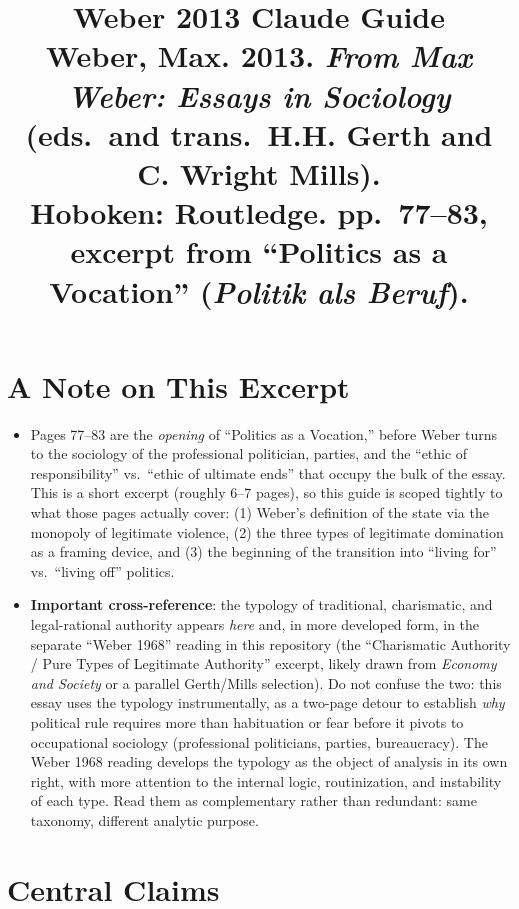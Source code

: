 \documentclass[12pt]{article}
\title{\textbf{Weber 2013 Claude Guide}\\
\large Weber, Max. 2013. \textit{From Max Weber: Essays in Sociology} (eds.\ and trans.\ H.H. Gerth and C. Wright Mills).\\
Hoboken: Routledge. pp.\ 77--83, excerpt from ``Politics as a Vocation'' (\textit{Politik als Beruf}).}
\author{}
\date{}
\begin{document}
\maketitle
\tableofcontents
\newpage

\section{A Note on This Excerpt}

\begin{itemize}[leftmargin=*, itemsep=4pt]
    \item Pages 77--83 are the \emph{opening} of ``Politics as a Vocation,'' before Weber turns to the sociology of the professional politician, parties, and the ``ethic of responsibility'' vs.\ ``ethic of ultimate ends'' that occupy the bulk of the essay. This is a short excerpt (roughly 6--7 pages), so this guide is scoped tightly to what those pages actually cover: (1) Weber's definition of the state via the monopoly of legitimate violence, (2) the three types of legitimate domination as a framing device, and (3) the beginning of the transition into ``living for'' vs.\ ``living off'' politics.
    \item \textbf{Important cross-reference}: the typology of traditional, charismatic, and legal-rational authority appears \emph{here} and, in more developed form, in the separate ``Weber 1968'' reading in this repository (the ``Charismatic Authority / Pure Types of Legitimate Authority'' excerpt, likely drawn from \textit{Economy and Society} or a parallel Gerth/Mills selection). Do not confuse the two: this essay uses the typology instrumentally, as a two-page detour to establish \emph{why} political rule requires more than habituation or fear before it pivots to occupational sociology (professional politicians, parties, bureaucracy). The Weber 1968 reading develops the typology as the object of analysis in its own right, with more attention to the internal logic, routinization, and instability of each type. Read them as complementary rather than redundant: same taxonomy, different analytic purpose.
\end{itemize}

\section{Central Claims}
\end{document}
